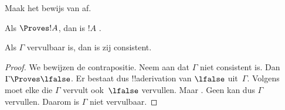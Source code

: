 \documentclass[../../../include/open-logic-section]{subfiles}
\begin{document}
\begin{prob}
  Maak het bewijs van  af.
\end{prob}
\tagendprob

\begin{cor}
Als $\Proves !A$, dan is $!A$ .
\end{cor}

\begin{cor}
Als $\Gamma$ vervulbaar is, dan is zij consistent.
\end{cor}

\begin{proof}
We bewijzen de contrapositie. Neem aan dat $\Gamma$ niet consistent
is. Dan $\Gamma \Proves \lfalse$. Er bestaat dus !!a{derivation} van
$\lfalse$ uit~$\Gamma$. Volgens  moet elke
die $\Gamma$ vervult ook~$\lfalse$ vervullen. Maar
. Geen
 kan dus $\Gamma$ vervullen.
Daarom is $\Gamma$ niet vervulbaar.
\end{proof}
\end{document}
